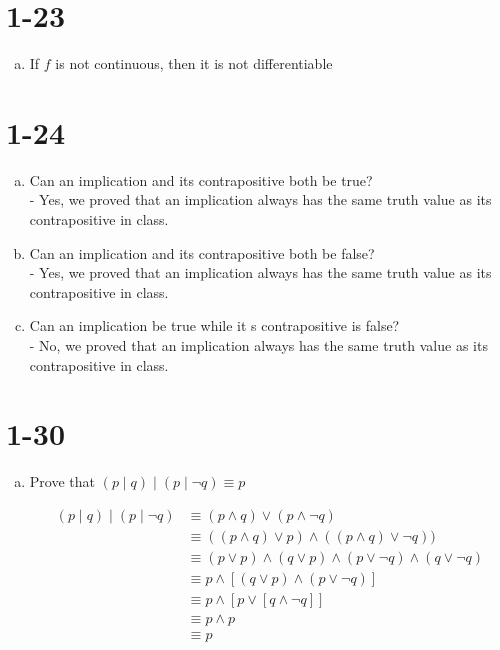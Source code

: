 \documentclass{article}
\begin{document}
\section{1-23}

\begin{enumerate}[a)]
    \item If $f$ is not continuous, then it is not differentiable
\end{enumerate}

\section{1-24}
\begin{enumerate}[a)]
    \item Can an implication and its contrapositive both be true? \\
        - Yes, we proved that an implication always has the same truth
        value as its contrapositive in class.
    \item Can an implication and its contrapositive both be false? \\
        - Yes, we proved that an implication always has the same truth
        value as its contrapositive in class.
    \item Can an implication be true while it s contrapositive is false? \\
        - No, we proved that an implication always has the same truth
        value as its contrapositive in class.
\end{enumerate}

\section{1-30}

\begin{enumerate}[a)]
    \item Prove that $(p \mid q) \mid (p \mid \neg q) \equiv p$

    \begin{align*}
        (p \mid q) \mid (p \mid \neg q) &\equiv (p \land q) \lor (p \land \neg q) \\
            &\equiv ((p \land q) \lor p) \land ((p \land q) \lor \neg q)) \\
            &\equiv (p \lor p) \land (q \lor p) \land (p \lor \neg q) \land (q \lor \neg q) \\
            &\equiv p \land [(q \lor p) \land (p \lor \neg q)] \\
            &\equiv p \land [p \lor [q \land \neg q]] \\
            &\equiv p \land p \\
            &\equiv p \\
    \end{align*}
\end{enumerate}
\end{document}
